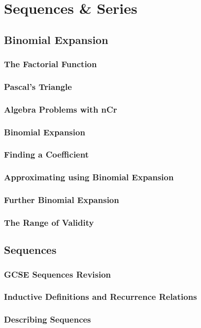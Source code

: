 \documentclass[../maths.tex]{subfiles}
\begin{document}
\chapter{Sequences \& Series}
\section{Binomial Expansion}
\subsection*{The Factorial Function}
\subsection*{Pascal's Triangle}
\subsection*{Algebra Problems with nCr}
\subsection*{Binomial Expansion}
\subsection*{Finding a Coefficient}
\subsection*{Approximating using Binomial Expansion}
\subsection*{Further Binomial Expansion}
\subsection*{The Range of Validity}
\section{Sequences}
\subsection*{GCSE Sequences Revision}
\subsection*{Inductive Definitions and Recurrence Relations}
\subsection*{Describing Sequences}
\end{document}
